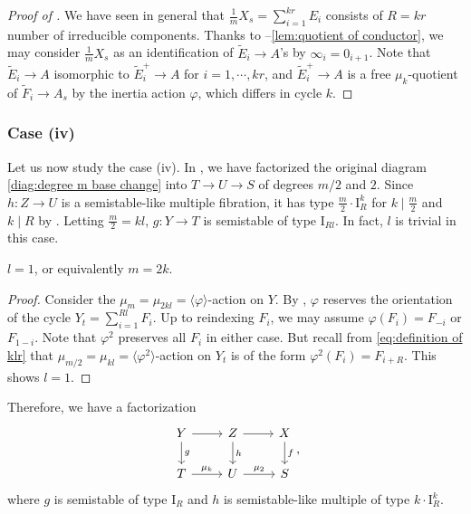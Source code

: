 \documentclass[reqno, letterpaper]{amsart}
\numberwithin{equation}{subsection}
\let\to\longrightarrow
\begin{document}
			\begin{proof} [Proof of ]
				We have seen in general that $\frac{1}{m} X_s = \sum_{i=1}^{kr} E_i$ consists of $R = kr$ number of irreducible components. Thanks to --\ref{lem:quotient of conductor}, we may consider $\frac{1}{m}X_s$ as an identification of $\tilde E_i \to A$'s by $\infty_i = 0_{i+1}$. Note that $\tilde E_i \to A$ isomorphic to $\tilde E_i^+ \to A$ for $i = 1, \cdots, kr$, and $\tilde E_i^+ \to A$ is a free $\mu_k$-quotient of $\tilde F_i \to A_s$ by the inertia action $\varphi$, which differs in cycle $k$.
			\end{proof}
			
			
			
		\subsubsection{Case (iv)}
			Let us now study the case (iv). In , we have factorized the original diagram \eqref{diag:degree m base change} into $T \to U \to S$ of degrees $m/2$ and $2$. Since $h : Z \to U$ is a semistable-like multiple fibration, it has type $\frac{m}{2} \cdot \mathrm I^k_R$ for $k \mid \frac{m}{2}$ and $k \mid R$ by . Letting $\frac{m}{2} = kl$, $g : Y \to T$ is semistable of type $\mathrm I_{Rl}$. In fact, $l$ is trivial in this case.
			
			\begin{lemma}
				$l = 1$, or equivalently $m = 2k$.
			\end{lemma}
			\begin{proof}
				Consider the $\mu_m = \mu_{2kl} = \langle \varphi \rangle$-action on $Y$. By , $\varphi$ reserves the orientation of the cycle $Y_t = \sum_{i=1}^{Rl} F_i$. Up to reindexing $F_i$, we may assume $\varphi(F_i) = F_{-i}$ or $F_{1-i}$. Note that $\varphi^2$ preserves all $F_i$ in either case. But recall from \eqref{eq:definition of klr} that $\mu_{m/2} = \mu_{kl} = \langle \varphi^2 \rangle$-action on $Y_t$ is of the form $\varphi^2 (F_i) = F_{i + R}$. This shows $l = 1$.
			\end{proof}
			
			Therefore, we have a factorization
			\[\begin{tikzcd}
				Y \arrow[r] \arrow[d, "g"] & Z \arrow[r] \arrow[d, "h"] & X \arrow[d, "f"] \\
				T \arrow[r, "\mu_k"] & U \arrow[r, "\mu_2"] & S
			\end{tikzcd},\]
			where $g$ is semistable of type $\mathrm I_R$ and $h$ is semistable-like multiple of type $k \cdot \mathrm I^k_R$.
			
\end{document}
